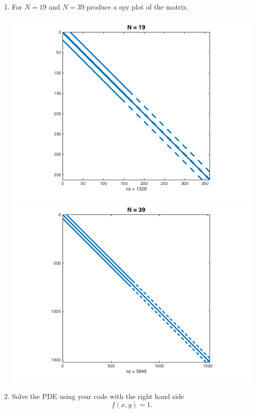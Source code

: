 \documentclass[11pt, oneside, titlepage]{article}
\begin{document}
\begin{enumerate}
    \item %
        For $N = 19$ and $N = 39$ produce a spy plot of the matrix.
        \begin{center}
            \includegraphics[scale=.5]{Figures/03_5_1.png}
            \includegraphics[scale=.5]{Figures/03_5_2.png}
        \end{center}

    \item %
        Solve the PDE using your code with the right hand side
        \[
            f(x, y) = 1.
        \]


\end{enumerate}
\end{document}
